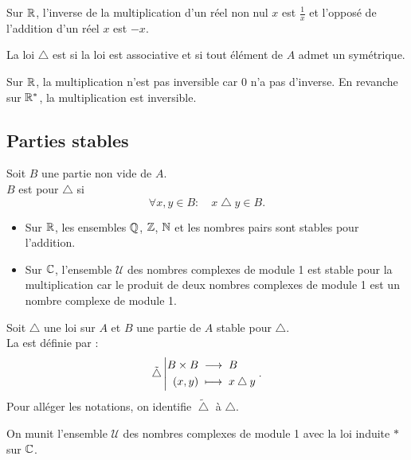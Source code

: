 \documentclass{book}
\begin{document}
\begin{Exemple}
Sur $\mathbb{R}$,  l'inverse de la multiplication d'un réel non nul $x$ est $\frac{1}{x}$ et l'opposé de l'addition d'un réel $x$ est $-x$.
\end{Exemple}

\begin{Definition}
La loi $\bigtriangleup$ est   si la loi est associative et si tout élément de $A$ admet un symétrique.
\end{Definition}

\begin{Exemple}
Sur $\mathbb{R}$, la multiplication n'est pas inversible car $0$ n'a pas d'inverse. En revanche sur $\mathbb{R}^*$, la multiplication est inversible.
\end{Exemple}
\subsection{Parties stables}
\begin{Definition}
Soit $B$ une partie non vide de $A$.\\
$B$ est  pour $\bigtriangleup$ si  
$$\forall x, y \in B :\quad   x \bigtriangleup y \in B.$$
\end{Definition}
\begin{Exemple}
\begin{itemize}
\item Sur $\mathbb{R}$, les ensembles $\mathbb{Q}$, $\mathbb{Z}$, $\mathbb{N}$ et les nombres pairs sont stables pour l'addition. 
\item Sur $\mathbb{C}$, l'ensemble $ \mathcal{U}$ des nombres complexes de module 1 est stable pour la multiplication car le produit de deux nombres
complexes de module 1 est un nombre complexe de module 1.
\end{itemize}
\end{Exemple}
\begin{Definition}
Soit $\bigtriangleup$ une loi sur $A$ et $B$ une partie de $A$ stable pour $\bigtriangleup$.\\
La  est définie par  :
$$ {\tilde{\bigtriangleup}}\left|\begin{aligned}{B\times B}&\;\longrightarrow\;{B}\\{(x,y)}&\;\longmapsto\;{x \bigtriangleup y}\end{aligned}\right..$$
Pour alléger les notations, on identifie $\tilde{\bigtriangleup}$ à $\bigtriangleup$. 
\end{Definition}
\begin{Exemple}On munit  l'ensemble $ \mathcal{U}$ des nombres complexes de module 1 avec la loi induite $*$ sur $\mathbb{C}$.
\end{Exemple}
\end{document}
